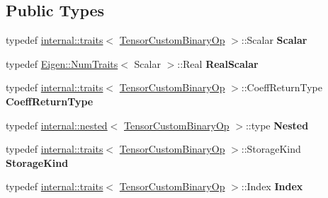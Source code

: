 \subsection*{Public Types}
\begin{DoxyCompactItemize}
\item 
\mbox{\label{class_eigen_1_1_tensor_custom_binary_op_afc0a57fd59c3e7e9cce983ad29514fb0}} 
typedef \hyperlink{struct_eigen_1_1internal_1_1traits}{internal\+::traits}$<$ \hyperlink{class_eigen_1_1_tensor_custom_binary_op}{Tensor\+Custom\+Binary\+Op} $>$\+::Scalar {\bfseries Scalar}
\item 
\mbox{\label{class_eigen_1_1_tensor_custom_binary_op_a858f286793a0e5a747ecfec12d3de29d}} 
typedef \hyperlink{group___core___module_struct_eigen_1_1_num_traits}{Eigen\+::\+Num\+Traits}$<$ Scalar $>$\+::Real {\bfseries Real\+Scalar}
\item 
\mbox{\label{class_eigen_1_1_tensor_custom_binary_op_a11a5ff799826713b07db4314fbcd4797}} 
typedef \hyperlink{struct_eigen_1_1internal_1_1traits}{internal\+::traits}$<$ \hyperlink{class_eigen_1_1_tensor_custom_binary_op}{Tensor\+Custom\+Binary\+Op} $>$\+::Coeff\+Return\+Type {\bfseries Coeff\+Return\+Type}
\item 
\mbox{\label{class_eigen_1_1_tensor_custom_binary_op_afbc60bdb9b84fba8f05ba4b7e8487d3b}} 
typedef \hyperlink{struct_eigen_1_1internal_1_1nested}{internal\+::nested}$<$ \hyperlink{class_eigen_1_1_tensor_custom_binary_op}{Tensor\+Custom\+Binary\+Op} $>$\+::type {\bfseries Nested}
\item 
\mbox{\label{class_eigen_1_1_tensor_custom_binary_op_a00f3f376a61b8eac00799d9cea41c684}} 
typedef \hyperlink{struct_eigen_1_1internal_1_1traits}{internal\+::traits}$<$ \hyperlink{class_eigen_1_1_tensor_custom_binary_op}{Tensor\+Custom\+Binary\+Op} $>$\+::Storage\+Kind {\bfseries Storage\+Kind}
\item 
\mbox{\label{class_eigen_1_1_tensor_custom_binary_op_a294c96969203c8d91ecaf2764310d935}} 
typedef \hyperlink{struct_eigen_1_1internal_1_1traits}{internal\+::traits}$<$ \hyperlink{class_eigen_1_1_tensor_custom_binary_op}{Tensor\+Custom\+Binary\+Op} $>$\+::Index {\bfseries Index}

\end{DoxyCompactItemize}
